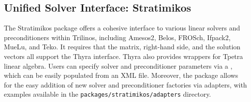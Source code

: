 \subsection{Unified Solver Interface: Stratimikos}
\label{sec:Stratimikos}
The Stratimikos package offers a cohesive interface to various linear solvers and preconditioners within Trilinos, including Amesos2, Belos, FROSch, Ifpack2, MueLu, and Teko.
It requires that the matrix, right-hand side, and the solution vectors all support the Thyra interface.
Thyra also provides wrappers for Tpetra linear algebra.
Users can specify solver and preconditioner parameters via a , which can be easily populated from an XML file.
Moreover, the package allows for the easy addition of new solver and preconditioner factories via adapters, with examples available in the \texttt{packages/stratimikos/adapters} directory.
